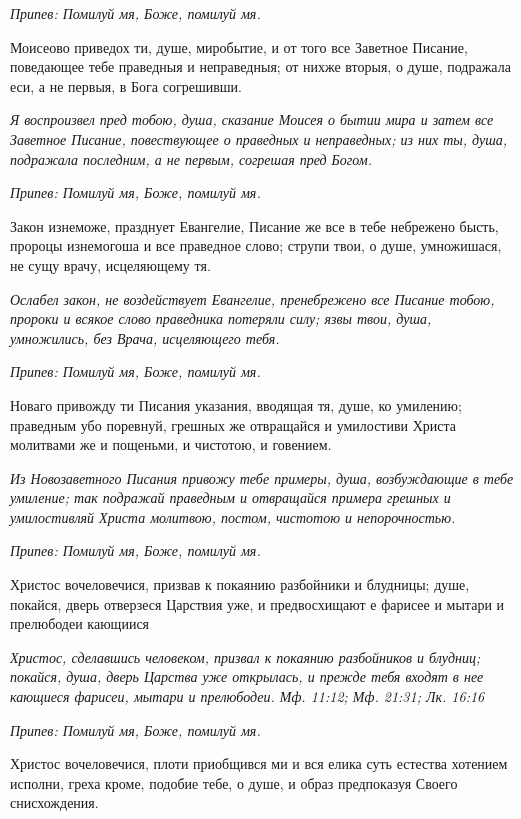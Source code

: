 \itshape Припев:\normalfont{} Помилуй мя, Боже, помилуй мя.


Моисеово приведох ти, душе, миробытие, и от того все Заветное Писание, поведающее тебе праведныя и неправедныя; от нихже вторыя, о душе, подражала еси, а не первыя, в Бога согрешивши.


\itshape Я воспроизвел пред тобою, душа, сказание Моисея о бытии мира и затем все Заветное Писание, повествующее о праведных и неправедных; из них ты, душа, подражала последним, а не первым, согрешая пред Богом.\normalfont{}


\itshape Припев:\normalfont{} Помилуй мя, Боже, помилуй мя.


Закон изнеможе, празднует Евангелие, Писание же все в тебе небрежено бысть, пророцы изнемогоша и все праведное слово; струпи твои, о душе, умножишася, не сущу врачу, исцеляющему тя.


\itshape Ослабел закон, не воздействует Евангелие, пренебрежено все Писание тобою, пророки и всякое слово праведника потеряли силу; язвы твои, душа, умножились, без Врача, исцеляющего тебя.\normalfont{}


\itshape Припев:\normalfont{} Помилуй мя, Боже, помилуй мя.


Новаго привожду ти Писания указания, вводящая тя, душе, ко умилению; праведным убо поревнуй, грешных же отвращайся и умилостиви Христа молитвами же и пощеньми, и чистотою, и говением.


\itshape Из Новозаветного Писания привожу тебе примеры, душа, возбуждающие в тебе умиление; так подражай праведным и отвращайся примера грешных и умилостивляй Христа молитвою, постом, чистотою и непорочностью.\normalfont{}


\itshape Припев:\normalfont{} Помилуй мя, Боже, помилуй мя.


Христос вочеловечися, призвав к покаянию разбойники и блудницы; душе, покайся, дверь отверзеся Царствия уже, и предвосхищают е фарисее и мытари и прелюбодеи кающиися


\itshape Христос, сделавшись человеком, призвал к покаянию разбойников и блудниц; покайся, душа, дверь Царства уже открылась, и прежде тебя входят в нее кающиеся фарисеи, мытари и прелюбодеи. Мф. 11:12; Мф. 21:31; Лк. 16:16\normalfont{}


\itshape Припев:\normalfont{} Помилуй мя, Боже, помилуй мя.


Христос вочеловечися, плоти приобщився ми и вся елика суть естества хотением исполни, греха кроме, подобие тебе, о душе, и образ предпоказуя Своего снисхождения.


